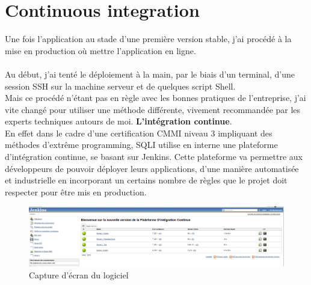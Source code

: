 \documentclass{report}
\newcommand{\jumpOne}{\\[1\baselineskip]}
\begin{document}
\newpage





\section{Continuous integration}

Une fois l'application au stade d'une première version stable, j'ai procédé à la mise en production où mettre l'application en ligne. \\  
\jumpOne
Au début, j'ai tenté le déploiement à la main, par le biais d'un terminal, d'une session \gls{SSH} sur la machine serveur et de quelques script Shell. \\
Mais ce procédé n'étant pas en règle avec les bonnes pratiques de l'entreprise, j'ai vite changé pour utiliser une méthode différente, vivement recommandée par les experts techniques autours de moi. \textbf{L'intégration continue}.
\jumpOne
En effet dans le cadre d'une certification CMMI niveau 3 impliquant des méthodes d'extrême programming, SQLI utilise en interne une plateforme d'intégration continue, se basant sur \gls{Jenkins}. 
Cette plateforme va permettre aux développeurs de pouvoir déployer leurs applications, d'une manière automatisée et industrielle en incorporant un certains nombre de règles que le projet doit respecter pour être mis en production.

\begin{figure}[h!]
	\centering
	\includegraphics[width=1\textwidth]{assets/screenshot/jenkins.png}
	\caption{Capture d'écran du logiciel}
\end{figure}
\end{document}
